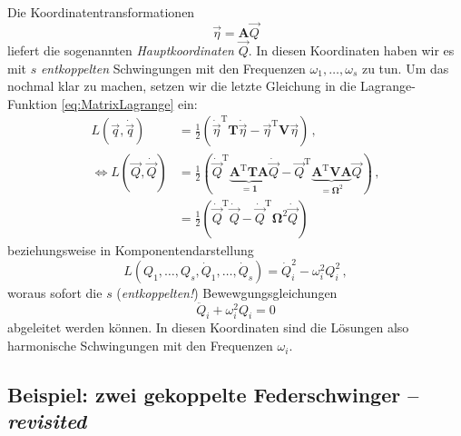 \documentclass[paper=a4, fontsize=11.0pt, abstractoff, DIV12]{scrartcl}
\begin{document}
Die Koordinatentransformationen
\begin{equation}
\vec \eta = \mathbf{A}\vec{Q}
\end{equation}
liefert die sogenannten \emph{Hauptkoordinaten} $\vec{Q}$. In diesen Koordinaten
haben wir es mit $s$ \emph{entkoppelten} Schwingungen mit den Frequenzen
$\omega_1, \dots, \omega_s$ zu tun. Um das nochmal klar zu machen, setzen wir
die letzte Gleichung in die Lagrange-Funktion \eqref{eq:MatrixLagrange} ein:
\begin{align}
L(\vec q, \dot{\vec q}) &= \frac{1}{2}\left(\dot{\vec{\eta}}^\mathrm{T}\mathbf{T}\dot{\vec{\eta}} - \vec{\eta}^\mathrm{T}\mathbf{V}\vec{\eta}\right)\,,\nonumber\\
\Leftrightarrow L(\vec Q, \dot{\vec Q}) &= \frac{1}{2}\left(\dot{\vec{Q}}^\mathrm{T}\underbrace{\mathbf{A}^\mathrm{T}\mathbf{T}\mathbf{A}}_{=\mathbf{1}}\dot{\vec{Q}} - \vec{Q}^\mathrm{T}\underbrace{\mathbf{A}^\mathrm{T}\mathbf{V}\mathbf{A}}_{=\mathbf{\Omega}^2}\vec{Q}\right)\,,\nonumber\\
&= \frac{1}{2}\left(\dot{\vec{Q}}^\mathrm{T}\dot{\vec Q} - \dot{\vec{Q}}^\mathrm{T}\mathbf{\Omega}^2\dot{\vec Q}\right)
\end{align}
beziehungsweise in Komponentendarstellung
\begin{equation}
L(Q_1,\dots,Q_s, \dot{Q}_1,\dots,\dot{Q}_s) = \dot{Q}_i^2 - \omega_i^2 Q_i^2\, ,
\end{equation}
woraus sofort die $s$ (\emph{entkoppelten!}) Bewewgungsgleichungen
\begin{equation}
\ddot{Q}_i + \omega_i^2 Q_i = 0
\end{equation}
abgeleitet werden können. In diesen Koordinaten sind die Lösungen also
harmonische Schwingungen mit den Frequenzen $\omega_i$.

\subsection*{Beispiel: zwei gekoppelte Federschwinger -- \emph{revisited}}
\end{document}
